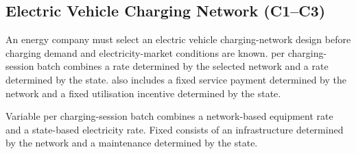 
\subsection{Electric Vehicle Charging Network (C1--C3)}
\label{sec:problem21-electric-vehicle-charging-network-c1-c3}

An energy company must select an electric vehicle charging-network design
before charging demand and electricity-market conditions are known.  per
charging-session batch combines a rate determined by the selected network and a
rate determined by the state.  also includes a fixed service payment
determined by the network and a fixed utilisation incentive determined by the
state.

Variable  per charging-session batch combines a network-based equipment
rate and a state-based electricity rate. Fixed  consists of an
infrastructure  determined by the network and a maintenance  determined
by the state.

